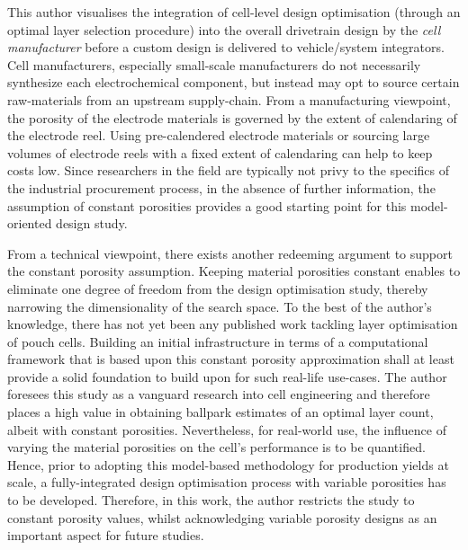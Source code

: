 This  author  visualises  the  integration  of  cell-level  design  optimisation
(through  an optimal  layer  selection procedure)  into  the overall  drivetrain
design  by the  \emph{cell manufacturer}  before  a custom  design is  delivered
to  vehicle/system  integrators.   Cell  manufacturers,  especially  small-scale
manufacturers do not necessarily  synthesize each electrochemical component, but
instead may opt  to source certain raw-materials from  an upstream supply-chain.
From  a  manufacturing  viewpoint,  the  porosity  of  the  electrode  materials
is  governed  by  the  extent  of  calendaring  of  the  electrode  reel.  Using
pre-calendered electrode materials or sourcing  large volumes of electrode reels
with a fixed extent of calendaring can help to keep costs low. Since researchers
in  the  field are  typically  not  privy to  the  specifics  of the  industrial
procurement process,  in the absence  of further information, the  assumption of
constant  porosities provides  a  good starting  point  for this  model-oriented
design study.

From a technical  viewpoint, there exists another redeeming  argument to support
the constant  porosity assumption. Keeping material  porosities constant enables
to eliminate one  degree of freedom from the design  optimisation study, thereby
narrowing the  dimensionality of the search  space. To the best  of the author's
knowledge, there has not yet been any published work tackling layer optimisation
of pouch cells.  Building an initial infrastructure in terms  of a computational
framework that is based upon this constant porosity approximation shall at least
provide  a solid  foundation to  build upon  for such  real-life use-cases.  The
author foresees  this study  as a  vanguard research  into cell  engineering and
therefore places  a high  value in  obtaining ballpark  estimates of  an optimal
layer count, albeit with constant  porosities. Nevertheless, for real-world use,
the influence of varying the material porosities on the cell's performance is to
be  quantified.  Hence,  prior  to adopting  this  model-based  methodology  for
production yields at scale, a  fully-integrated design optimisation process with
variable porosities  has to be  developed. Therefore,  in this work,  the author
restricts the study  to constant porosity values,  whilst acknowledging variable
porosity designs as an important aspect for future studies.

